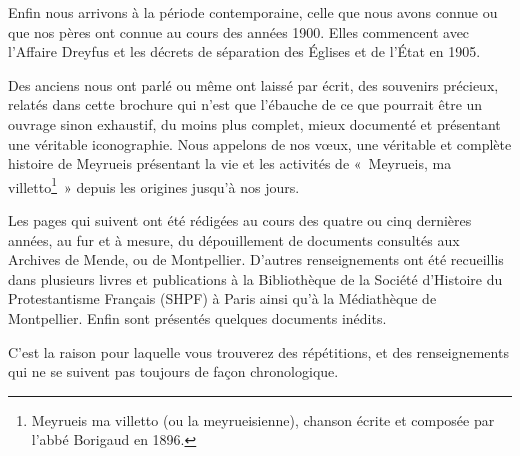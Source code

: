 Enfin nous arrivons à la période contemporaine, celle que nous avons connue ou que nos pères ont connue au cours des années 1900. Elles commencent avec l'Affaire Dreyfus et les décrets de séparation des Églises et de l’État en 1905.

Des anciens nous ont parlé ou même ont laissé par écrit, des souvenirs précieux, relatés dans cette brochure qui n’est que l’ébauche de ce que pourrait être un ouvrage sinon exhaustif, du moins plus complet, mieux documenté et présentant une véritable iconographie. Nous appelons de nos vœux, une véritable et complète histoire de Meyrueis présentant la vie et les activités de «~Meyrueis, ma villetto\footnote{Meyrueis ma villetto (ou la meyrueisienne), chanson écrite et composée par l'abbé Borigaud en 1896.}~» depuis les origines jusqu’à nos jours.

\vspace{0.35em}

\begin{tcolorbox}[
  colback=white,
  colframe=black,
  boxrule=0.7pt,
  arc=0pt,
  left=0.25cm,
  right=0.25cm,
  top=0.12cm,
  bottom=0.12cm,
  boxsep=0pt
]
\small
Les pages qui suivent ont été rédigées au cours des quatre ou cinq dernières années, au fur et à mesure, du dépouillement de documents consultés aux Archives de Mende, ou de Montpellier. D’autres renseignements ont été recueillis dans plusieurs livres et publications à la Bibliothèque de la Société d’Histoire du Protestantisme Français (SHPF) à Paris ainsi qu’à la Médiathèque de Montpellier. Enfin sont présentés quelques documents inédits.

C’est la raison pour laquelle vous trouverez des répétitions, et des renseignements qui ne se suivent pas toujours de façon chronologique.
\end{tcolorbox}


